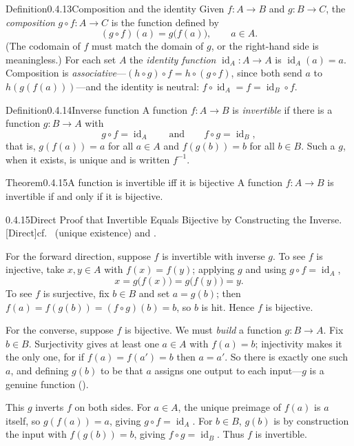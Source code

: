\documentclass[main.tex]{subfiles}
\begin{document}
\begin{Obj}{Definition}{0.4.13}{Composition and the identity}
Given $f\colon A\to B$ and $g\colon B\to C$, the \emph{composition} $g\circ f\colon A\to C$ is the
function defined by
\[
(g\circ f)(a)=g\bigl(f(a)\bigr),\qquad a\in A.
\]
(The codomain of $f$ must match the domain of $g$, or the right-hand side is meaningless.) For each set
$A$ the \emph{identity function} $\operatorname{id}_A\colon A\to A$ is $\operatorname{id}_A(a)=a$.
Composition is \emph{associative}---$(h\circ g)\circ f=h\circ(g\circ f)$, since both send $a$ to
$h(g(f(a)))$---and the identity is neutral: $f\circ\operatorname{id}_A=f=\operatorname{id}_B\circ f$.
\end{Obj}

\begin{Obj}{Definition}{0.4.14}{Inverse function}
A function $f\colon A\to B$ is \emph{invertible} if there is a function $g\colon B\to A$ with
\[
g\circ f=\operatorname{id}_A
\qquad\text{and}\qquad
f\circ g=\operatorname{id}_B,
\]
that is, $g(f(a))=a$ for all $a\in A$ and $f(g(b))=b$ for all $b\in B$. Such a $g$, when it exists, is
unique and is written $f^{-1}$.
\end{Obj}

\begin{Obj}{Theorem}{0.4.15}{A function is invertible iff it is bijective}
A function $f\colon A\to B$ is invertible if and only if it is bijective.
\end{Obj}

\begin{Prf}{0.4.15}{Direct Proof that Invertible Equals Bijective by Constructing the Inverse.}{[Direct]\quad cf.\  (unique existence) and .}
\item For the forward direction, suppose $f$ is invertible with inverse $g$. To see $f$ is injective,
take $x,y\in A$ with $f(x)=f(y)$; applying $g$ and using $g\circ f=\operatorname{id}_A$,
\[
x=g\bigl(f(x)\bigr)=g\bigl(f(y)\bigr)=y.
\]
To see $f$ is surjective, fix $b\in B$ and set $a=g(b)$; then
$f(a)=f(g(b))=(f\circ g)(b)=b$, so $b$ is hit. Hence $f$ is bijective.
\item For the converse, suppose $f$ is bijective. We must \emph{build} a function $g\colon B\to A$.
Fix $b\in B$. Surjectivity gives at least one $a\in A$ with $f(a)=b$; injectivity makes it the only
one, for if $f(a)=f(a')=b$ then $a=a'$. So there is exactly one such $a$, and defining $g(b)$ to be
that $a$ assigns one output to each input---$g$ is a genuine function ().
\item This $g$ inverts $f$ on both sides. For $a\in A$, the unique preimage of $f(a)$ is $a$ itself,
so $g(f(a))=a$, giving $g\circ f=\operatorname{id}_A$. For $b\in B$, $g(b)$ is by construction the
input with $f(g(b))=b$, giving $f\circ g=\operatorname{id}_B$. Thus $f$ is invertible.
\end{Prf}
\end{document}
